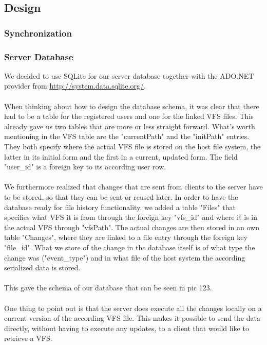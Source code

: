\documentclass[a4paper,12pt]{article}
\begin{document}
\subsection{Design}

\subsubsection{Synchronization}

\subsubsection{Server Database}
We decided to use SQLite for our server database together with the ADO.NET provider from \url{http://system.data.sqlite.org/}.\\
\\
When thinking about how to design the database schema, it was clear that there had to be a table for the registered users and one for the linked VFS files. This already gave us two tables that are more or less straight forward. What’s worth mentioning in the VFS table are the "currentPath" and the "initPath" entries. They both specify where the actual VFS file is stored on the host file system, the latter in its initial form and the first in a current, updated form. The field "user\_id" is a foreign key to its according user row.\\
\\
We furthermore realized that changes that are sent from clients to the server have to be stored, so that they can be sent or reused later. In order to have the database ready for file history functionality, we added a table "Files" that specifies what VFS it is from through the foreign key "vfs\_id" and where it is in the actual VFS through "vfsPath". The actual changes are then stored in an own table "Changes", where they are linked to a file entry through the foreign key "file\_id". What we store of the change in the database itself is of what type the change was ("event\_type") and in what file of the host system the according serialized data is stored.\\
\\
This gave the schema of our database that can be seen in pic 123.\\%
\\
One thing to point out is that the server does execute all the changes locally on a current version of the according VFS file. This makes it possible to send the data directly, without having to execute any updates, to a client that would like to retrieve a VFS. 
\end{document}
